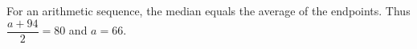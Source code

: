 For an arithmetic sequence, the median equals the average of the endpoints. Thus $\dfrac{a+94}{2}=80$ and $\boxed{a=66}$.
